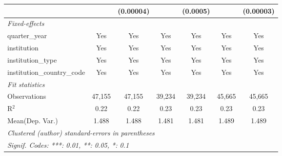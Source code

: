 \begin{tabular}{lcccccc}
                                      &               & (0.00004)     &               & (0.0005)      &               & (0.00003)\\   
   \midrule
   \emph{Fixed-effects}\\
   quarter\_year                      & Yes           & Yes           & Yes           & Yes           & Yes           & Yes\\  
   institution                        & Yes           & Yes           & Yes           & Yes           & Yes           & Yes\\  
   institution\_type                  & Yes           & Yes           & Yes           & Yes           & Yes           & Yes\\  
   institution\_country\_code         & Yes           & Yes           & Yes           & Yes           & Yes           & Yes\\  
   \midrule
   \emph{Fit statistics}\\
   Observations                       & 47,155        & 47,155        & 39,234        & 39,234        & 45,665        & 45,665\\  
   R$^2$                              & 0.22          & 0.22          & 0.23          & 0.23          & 0.23          & 0.23\\  
Mean(Dep. Var.) & 1.488 & 1.488 & 1.481 & 1.481 & 1.489 & 1.489 \\
   \midrule \midrule
   \multicolumn{7}{l}{\emph{Clustered (author) standard-errors in parentheses}}\\
   \multicolumn{7}{l}{\emph{Signif. Codes: ***: 0.01, **: 0.05, *: 0.1}}\\
\end{tabular}
\par\endgroup
